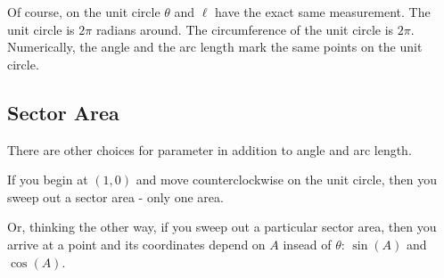 \documentclass{ximera}
\begin{document}
Of course, on the unit circle $\theta$ and $\ell$ have the exact same measurement.  The unit circle is $2\pi$ radians around.  The circumference of the unit circle is $2\pi$. Numerically, the angle and the arc length mark the same points on the unit circle. 




























\subsection{Sector Area}


There are other choices for parameter in addition to angle and arc length.

If you begin at $(1,0)$ and move counterclockwise on the unit circle, then you sweep out a sector area - only one area.


Or, thinking the other way, if you sweep out a particular sector area, then you arrive at a point and its coordinates depend on $A$ insead of $\theta$: $\sin(A)$ and $\cos(A)$.
\end{document}
